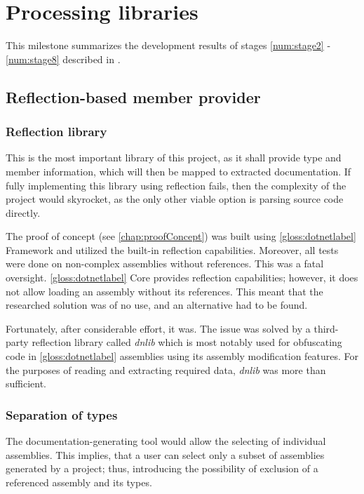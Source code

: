 \chapter{Processing libraries} \label{chap:processingLibraries}

This milestone summarizes the development results of stages \ref{num:stage2} - \ref{num:stage8} described in .

\section{Reflection-based member provider}

\subsection{Reflection library}

This is the most important library of this project, as it shall provide type and member information, which will then be mapped to extracted documentation. If fully implementing this library using reflection fails, then the complexity of the project would skyrocket, as the only other viable option is parsing source code directly.

The proof of concept (see \ref{chap:proofConcept}) was built using \ref{gloss:dotnetlabel} Framework and utilized the built-in reflection capabilities. Moreover, all tests were done on non-complex assemblies without references. This was a fatal oversight. \ref{gloss:dotnetlabel} Core provides reflection capabilities; however, it does not allow loading an assembly without its references. This meant that the researched solution was of no use, and an alternative had to be found.

Fortunately, after considerable effort, it was. The issue was solved by a third-party reflection library called \textit{dnlib} which is most notably used for obfuscating code in \ref{gloss:dotnetlabel} assemblies using its assembly modification features. For the purposes of reading and extracting required data, \textit{dnlib} was more than sufficient.

\subsection{Separation of types}

The documentation-generating tool would allow the selecting of individual assemblies. This implies, that a user can select only a subset of assemblies generated by a project; thus, introducing the possibility of exclusion of a referenced assembly and its types.


